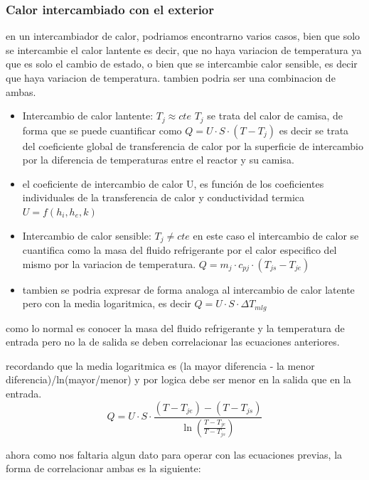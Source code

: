 \documentclass{report}
\begin{document}
\subsubsection{Calor intercambiado con el exterior}
en un intercambiador de calor, podriamos encontrarno varios casos, bien que solo se intercambie el calor lantente es decir, que no haya variacion de temperatura ya que es solo el cambio de estado, o bien que se intercambie calor sensible, es decir que haya variacion de temperatura.
tambien podria ser una combinacion de ambas.
\begin{itemize}
	\item Intercambio de calor lantente: $T_j \approx cte$ $T_j$ se trata del calor de camisa, de forma que se puede cuantificar como $Q = U\cdot S \cdot (T-T_j)$ es decir se trata del coeficiente global de transferencia de calor por la superficie de intercambio por la diferencia de temperaturas entre el reactor y su camisa.
	\item []el coeficiente de intercambio de calor U, es función de los coeficientes individuales de la transferencia de calor y conductividad termica $U = f(h_i,h_e,k)$
	\item Intercambio de calor sensible: $T_j \neq cte$ en este caso el intercambio de calor se cuantifica como la masa del fluido refrigerante por el calor especifico del mismo por la variacion de temperatura. $Q = m_j \cdot c_{pj} \cdot (T_{js}-T_{je})$
	\item []tambien se podria expresar de forma analoga al intercambio de calor latente pero con la media logaritmica, es decir $Q = U\cdot S \cdot \Delta T_{mlg}$
\end{itemize}
como lo normal es conocer la masa del fluido refrigerante y la temperatura de entrada pero no la de salida se deben correlacionar las ecuaciones anteriores.
\begin{note}
	recordando que la media logaritmica es (la mayor diferencia - la menor diferencia)/ln(mayor/menor) y por logica debe ser menor en la salida que en la entrada.
	\begin{equation*}
		Q = U \cdot S \cdot \frac{(T-T_{je})-(T-T_{js})}{\ln\left(\frac{T-T_{je}}{T-T_{js}}\right)}
	\end{equation*}
\end{note}
\noindent ahora como nos faltaria algun dato para operar con las ecuaciones previas, la forma de correlacionar ambas es la siguiente:
\newpage
\end{document}
